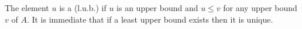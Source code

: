 The element $u$ is a  (l.u.b.) if $u$ is an upper bound and $u \leq v$ for any upper bound $v$ of $A$. It is immediate that if a least upper bound exists then it is unique.
